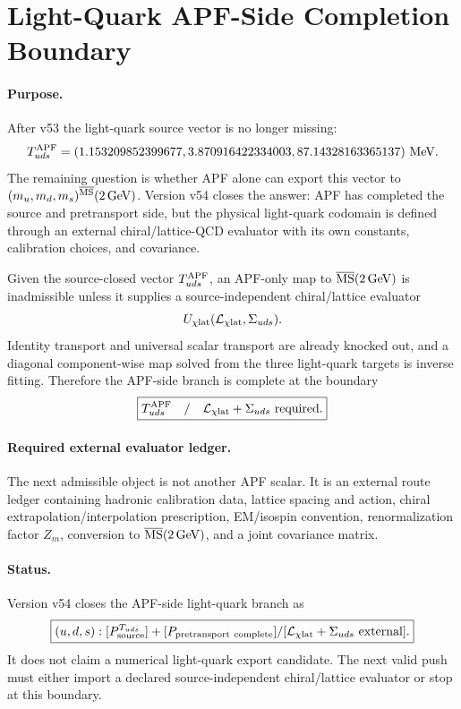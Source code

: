 \section{Light-Quark APF-Side Completion Boundary}
\label{sec:light-quark-apf-boundary-v54}

\paragraph{Purpose.}
After v53 the light-quark source vector is no longer missing:
\[
T_{uds}^{\rm APF}=(1.153209852399677,3.870916422334003,87.14328163365137)\ {\rm MeV}.
\]
The remaining question is whether APF alone can export this vector to
\((m_u,m_d,m_s)^{\overline{\rm MS}}(2\,{\rm GeV})\).  Version v54 closes the
answer: APF has completed the source and pretransport side, but the physical
light-quark codomain is defined through an external chiral/lattice-QCD
evaluator with its own constants, calibration choices, and covariance.

\begin{theorem}
Given the source-closed vector \(T_{uds}^{\rm APF}\), an APF-only map to
\(\overline{\rm MS}(2\,{\rm GeV})\) is inadmissible unless it supplies a
source-independent chiral/lattice evaluator
\[
U_{\chi{\rm lat}}(\mathcal L_{\chi{\rm lat}},\Sigma_{uds}).
\]
Identity transport and universal scalar transport are already knocked out, and
a diagonal component-wise map solved from the three light-quark targets is
inverse fitting.  Therefore the APF-side branch is complete at the boundary
\[
\boxed{
T_{uds}^{\rm APF}
\quad/\quad
\mathcal L_{\chi{\rm lat}}+\Sigma_{uds}\ {\rm required}.
}
\]
\end{theorem}

\paragraph{Required external evaluator ledger.}
The next admissible object is not another APF scalar.  It is an external route
ledger containing hadronic calibration data, lattice spacing and action,
chiral extrapolation/interpolation prescription, EM/isospin convention,
renormalization factor \(Z_m\), conversion to
\(\overline{\rm MS}(2\,{\rm GeV})\), and a joint covariance matrix.

\paragraph{Status.}
Version v54 closes the APF-side light-quark branch as
\[
\boxed{
(u,d,s):[P_{\rm source}^{T_{uds}}]
+[P_{\rm pretransport\ complete}]
/[\mathcal L_{\chi{\rm lat}}+\Sigma_{uds}\ {\rm external}].
}
\]
It does not claim a numerical light-quark export candidate.  The next valid
push must either import a declared source-independent chiral/lattice evaluator
or stop at this boundary.
